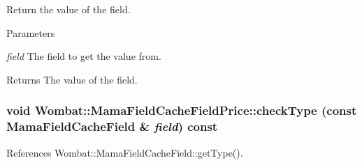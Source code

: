 Return the value of the field. 
\begin{DoxyParams}{Parameters}
\item[{\em field}]The field to get the value from. \end{DoxyParams}
\begin{DoxyReturn}{Returns}
The value of the field. 
\end{DoxyReturn}
\hypertarget{classWombat_1_1MamaFieldCacheFieldPrice_a6f7841874b57b8cdb68ebe09ff1d44b9}{
\subsubsection[{checkType}]{\setlength{\rightskip}{0pt plus 5cm}void Wombat::MamaFieldCacheFieldPrice::checkType (const {\bf MamaFieldCacheField} \& {\em field}) const}}
\label{classWombat_1_1MamaFieldCacheFieldPrice_a6f7841874b57b8cdb68ebe09ff1d44b9}


References Wombat::MamaFieldCacheField::getType().